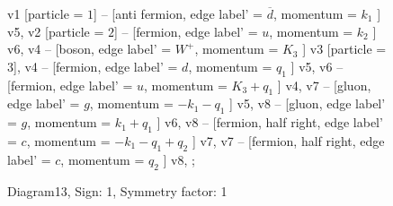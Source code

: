 \documentclass{revtex4}
\begin{document}
\begin{figure}[!htb]
\begin{center}
{    %
v1 [particle = \(1\)] -- [anti fermion, edge label' = \(\overline{d}\), momentum = \(k_{1}\) ] v5, 
v2 [particle = \(2\)] -- [fermion, edge label' = \(u\), momentum = \(k_{2}\) ] v6, 
v4 -- [boson, edge label' = \(W^{+}\), momentum = \(K_{3}\) ] v3 [particle = \(3\)], 
v4 -- [fermion, edge label' = \(d\), momentum = \(q_{1}\) ] v5, 
v6 -- [fermion, edge label' = \(u\), momentum = \(K_{3} + q_{1}\) ] v4, 
v7 -- [gluon, edge label' = \(g\), momentum = \(-k_{1} - q_{1}\) ] v5, 
v8 -- [gluon, edge label' = \(g\), momentum = \(k_{1} + q_{1}\) ] v6, 
v8 -- [fermion, half right, edge label' = \(c\), momentum = \(-k_{1} - q_{1} + q_{2}\) ] v7, 
v7 -- [fermion, half right, edge label' = \(c\), momentum = \(q_{2}\) ] v8, 
};
\end{center}
\caption{Diagram13, Sign: 1, Symmetry factor: 1}
\end{figure}
\newpage
\end{document}
